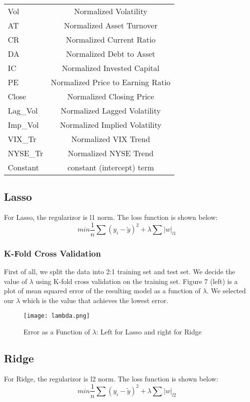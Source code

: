 \documentclass[a4paper]{article}
\begin{document}
\begin{center}
\begin{tabular}{ l | c  }
 \hline
Vol & Normalized Volatility\\
AT & Normalized Asset Turnover\\
CR & Normalized Current Ratio\\
DA & Normalized Debt to Asset\\
IC & Normalized Invested Capital\\
PE & Normalized Price to Earning Ratio\\
Close & Normalized Closing Price\\
Lag\_Vol & Normalized Lagged Volatility\\
Imp\_Vol & Normalized Implied Volatility\\
VIX\_Tr & Normalized VIX Trend\\
NYSE\_Tr & Normalized NYSE Trend\\
Constant & constant (intercept) term\\
\hline
 \end{tabular}
\end{center}   

\subsection{Lasso}
For Lasso, the regularizor is l1 norm. The loss function is shown below:
\begin{equation}
min \frac{1}{n} \sum (y_i - \widetilde{y})^2 + \lambda \sum |w|_{l1}
\end{equation}

\subsubsection{K-Fold Cross Validation}
First of all, we split the data into 2:1 training set and test set. We decide the value of $\lambda$ using K-fold cross validation on the training set. Figure 7 (left) is a plot of mean squared error of the resulting model as a function of $\lambda$. We selected our $\lambda$ which is the value that achieves the lowest error.

\begin{figure}[h]
\centering
\texttt{[image: lambda.png]}
\caption{\label{fig:lambda}Error as a Function of $\lambda$: Left for Lasso and right for Ridge}
\end{figure}

\subsection{Ridge}
For Ridge, the regularizor is l2 norm. The loss function is shown below:
\begin{equation}
min \frac{1}{n} \sum (y_i - \widetilde{y})^2 + \lambda \sum |w|_{l2}
\end{equation}
\end{document}
